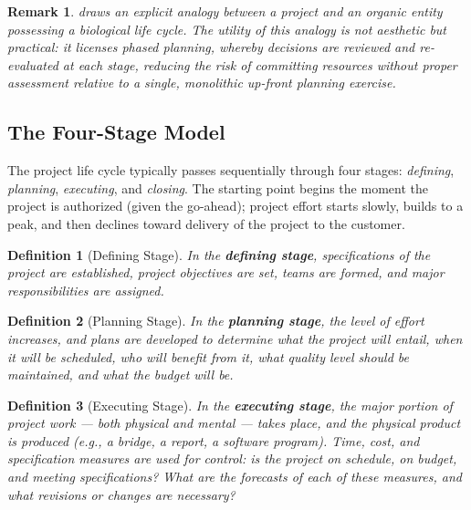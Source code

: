 \documentclass[12pt, a4paper]{report}
\theoremstyle{engnotes}
\newtheorem{defn}{Definition}[section]
\newtheorem{remark}{Remark}[section]
\begin{document}
\begin{remark}
     draws an explicit analogy between a project and an organic entity possessing a biological life cycle. The utility of this analogy is not aesthetic but practical: it licenses \emph{phased planning}, whereby decisions are reviewed and re-evaluated at each stage, reducing the risk of committing resources without proper assessment relative to a single, monolithic up-front planning exercise.
\end{remark}

\subsection{The Four-Stage Model}
\label{subsec:four_stage_model}

The project life cycle typically passes sequentially through four stages: \emph{defining}, \emph{planning}, \emph{executing}, and \emph{closing}. The starting point begins the moment the project is authorized (given the go-ahead); project effort starts slowly, builds to a peak, and then declines toward delivery of the project to the customer.

\begin{defn}[Defining Stage]\label{def:defining_stage}
    In the \textbf{defining stage}, specifications of the project are established, project objectives are set, teams are formed, and major responsibilities are assigned.
\end{defn}

\begin{defn}[Planning Stage]\label{def:planning_stage}
    In the \textbf{planning stage}, the level of effort increases, and plans are developed to determine what the project will entail, when it will be scheduled, who will benefit from it, what quality level should be maintained, and what the budget will be.
\end{defn}

\begin{defn}[Executing Stage]\label{def:executing_stage}
    In the \textbf{executing stage}, the major portion of project work --- both physical and mental --- takes place, and the physical product is produced (e.g., a bridge, a report, a software program). Time, cost, and specification measures are used for control: is the project on schedule, on budget, and meeting specifications? What are the forecasts of each of these measures, and what revisions or changes are necessary?
\end{defn}
\end{document}
